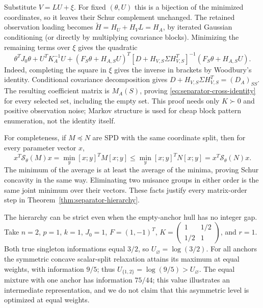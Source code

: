 Substitute $V=LU+\xi$. For fixed $(\theta,U)$ this is a bijection of the
minimized coordinates, so it leaves their Schur complement unchanged.
The retained observation loading becomes
$\widetilde H=H_U+H_VL=H_A$, by iterated Gaussian conditioning (or directly
by multiplying covariance blocks). Minimizing the remaining terms over $\xi$
gives the quadratic
\[
 \theta^TJ_0\theta+U^TK_A^{-1}U
 +(F_S\theta+H_{A,S}U)^T
 [D+H_{V,S}\Sigma H_{V,S}^T]^{-1}
 (F_S\theta+H_{A,S}U).
\]
Indeed, completing the square in $\xi$ gives the inverse in brackets by
Woodbury's identity. Conditional covariance decomposition gives
$D+H_{V,S}\Sigma H_{V,S}^T=(D_A)_{SS}$.
The resulting coefficient matrix is $M_A(S)$, proving
\eqref{eq:separator-cross-identity} for every selected set, including the
empty set. This proof needs only $K\succ0$ and positive observation noise;
Markov structure is used for cheap block pattern enumeration, not the
identity itself.

For completeness, if $M\preceq N$ are SPD with the same coordinate split,
then for every parameter vector $x$,
\[
 x^T\mathcal S_\theta(M)x
 =\min_y[x;y]^TM[x;y]
 \le\min_y[x;y]^TN[x;y]
 =x^T\mathcal S_\theta(N)x.
\]
The minimum of the average is at least the average of the minima, proving
Schur concavity in the same way. Eliminating two nuisance groups in either
order is the same joint minimum over their vectors. These facts justify
every matrix-order step in Theorem~\ref{thm:separator-hierarchy}.

The hierarchy can be strict even when the empty-anchor hull has no integer
gap. Take $n=2$, $p=1$, $k=1$, $J_0=1$, $F=(1,-1)^T$,
$K=\left(\begin{smallmatrix}1&1/2\\1/2&1\end{smallmatrix}\right)$,
and $r=1$. Both true singleton informations equal $3/2$, so
$U_\varnothing=\log(3/2)$. For all anchors the symmetric concave scalar-split
relaxation attains its maximum at equal weights, with information $9/5$;
thus $U_{\{1,2\}}=\log(9/5)>U_\varnothing$.
The equal mixture with one anchor has information $75/44$; this value
illustrates an intermediate representation, and we do not claim that this
asymmetric level is optimized at equal weights.

